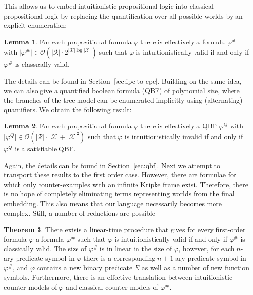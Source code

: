 \documentclass{easychair}
\theoremstyle{definition}
\newtheorem{theorem}{Theorem}[section]
\theoremstyle{definition}
\theoremstyle{definition}
\newtheorem{lemma}[theorem]{Lemma}
\theoremstyle{definition}
\theoremstyle{definition}
\theoremstyle{definition}
\theoremstyle{definition}
\begin{document}
This allows us to embed intuitionistic propositional logic into classical propositional logic by replacing the quantification over all possible worlds by an explicit enumeration:

\begin{lemma}
	For each propositional formula $\varphi$ there is effectively a formula $\varphi^\#$ with $\mathcal |\varphi^\#|\in\mathcal O(|\mathcal R|\cdot 2^{|\mathcal X|\log|\mathcal X|})$ such that $\varphi$ is intuitionistically valid if and only if $\varphi^\#$ is classically valid.
\end{lemma}

The details can be found in Section~\ref{sec:ipc-to-cpc}.
Building on the same idea, we can also give a quantified boolean formula (QBF) of polynomial size, where the branches of the tree-model can be enumerated implicitly using (alternating) quantifiers. We obtain the following result:


\begin{lemma}
	For each propositional formula $\varphi$ there is effectively a QBF $\varphi^Q$ with $\mathcal |\varphi^Q|\in\mathcal O(|\mathcal R|\cdot|\mathcal X| + |\mathcal X|^3)$ such that $\varphi$ is intuitionistically invalid if and only if $\varphi^Q$ is a satisfiable QBF.
\end{lemma}

Again, the details can be found in Section~\ref{sec:qbf}.
Next we attempt to transport these results to the first order case. However, there are formulae for which only counter-examples with an infinite Kripke frame exist. Therefore, there is no hope of completely eliminating terms representing worlds from the final embedding. This also means that our language necessarily becomes more complex. Still, a number of reductions are possible.

\begin{theorem}
	\label{thm:reduction-first-order-short}
	There exists a linear-time procedure that gives for every first-order formula $\varphi$ a formula $\varphi^\#$ such that $\varphi$ is intuitionistically valid if and only if $\varphi^\#$ is classically valid. The size of $\varphi^\#$ is in linear in the size of $\varphi$, however, for each $n$-ary predicate symbol in $\varphi$ there is a corresponding $n+1$-ary predicate symbol in $\varphi^\#$, and $\varphi$ contains a new binary predicate $E$ as well as a number of new function symbols. Furthermore, there is an effective translation between intuitionistic counter-models of $\varphi$ and classical counter-models of $\varphi^\#$.
\end{theorem}
\end{document}
